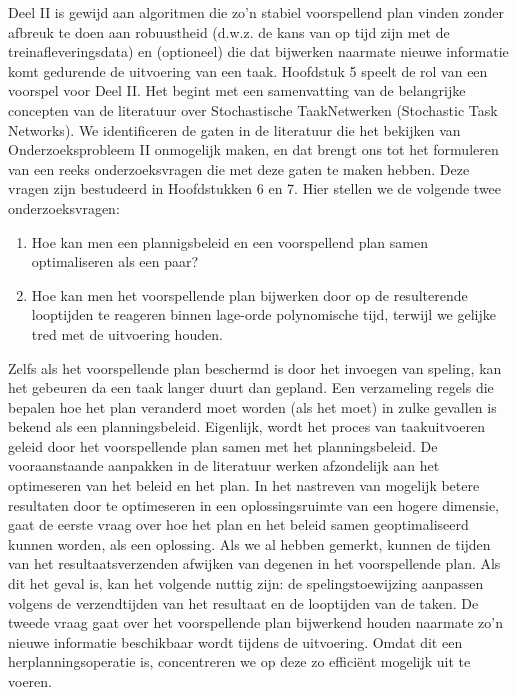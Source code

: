 Deel II is gewijd aan algoritmen die zo’n stabiel voorspellend plan vinden zonder afbreuk te doen aan robuustheid (d.w.z. de kans van op tijd zijn met de treinaf\-leveringsdata) 
en (optioneel) die dat bijwerken naarmate nieuwe informatie komt gedurende de uitvoering van een taak.  
Hoofdstuk 5 speelt de rol van een voorspel voor Deel II. 
Het begint met een samenvatting van de belangrijke concepten van de literatuur over Stochastische TaakNetwerken (Stochastic Task Networks). 
We identificeren de gaten in de literatuur die het bekijken van Onderzoeksprobleem II onmogelijk maken, 
en dat brengt ons tot het formuleren van een reeks onderzoeksvragen die met deze gaten te maken hebben. 
Deze vragen zijn bestudeerd in Hoofdstukken 6 en 7. Hier stellen we de volgende twee onderzoeksvragen:
\begin{enumerate}
	\item{Hoe kan men een plannigsbeleid en een voorspellend plan samen optimaliseren als een paar?}
	\item{Hoe kan men het voorspellende plan bijwerken door op de resulterende looptijden te reageren binnen lage-orde polynomische tijd, terwijl we gelijke tred met de uitvoering houden.}
\end{enumerate}
Zelfs als het voorspellende plan beschermd is door het invoegen van speling, 
kan het gebeuren da een taak langer duurt dan gepland. 
Een verzameling regels die bepalen hoe het plan veranderd moet worden (als het moet) in zulke gevallen is bekend als een planningsbeleid. 
Eigenlijk, wordt het proces van taakuitvoeren geleid door het voorspellende plan samen met het planningsbeleid. 
De vooraan\-staande aanpakken in de literatuur werken afzondelijk aan het optimeseren van het beleid en het plan. 
In het nastreven van mogelijk betere resultaten door te optimeseren in een oplossingsruimte van een hogere dimensie, 
gaat de eerste vraag over hoe het plan en het beleid samen geoptimaliseerd kunnen worden, als een oplossing. 
Als we al hebben gemerkt, kunnen de tijden van het resultaatsverzenden afwijken van degenen in het voorspellende plan. 
Als dit het geval is, kan het volgende nuttig zijn: 
de spelingstoewijzing aanpassen volgens de verzendtijden van het resultaat en de looptijden van de taken. 
De tweede vraag gaat over het voorspellende plan bijwerkend houden naarmate zo’n nieuwe informatie beschikbaar wordt  tijdens de uitvoering. 
Omdat dit een herplanningsoperatie is, concentreren we op deze zo efficiënt mogelijk uit te voeren.

